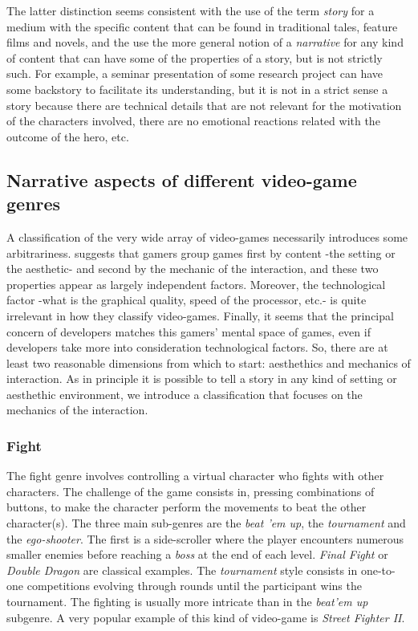 \documentclass[
		twoside,openright,titlepage,numbers=noenddot,manychapters,
		headinclude,%
                footinclude=false,cleardoublepage=empty,
                BCOR=5mm,
		fontsize=11pt, %
                 enabledeprecatedfontcommands]{scrreprt}
\begin{document}
The latter distinction seems consistent with the use of the term \emph{story} for a medium with the specific content that can be found in traditional tales, feature films and novels, and the use the more general notion of a \emph{narrative} for any kind of content that can have some of the properties of a story, but is not strictly such. For example, a seminar presentation of some research project can have some backstory to facilitate its understanding, but it is not in a strict sense a story because there are technical details that are not relevant for the motivation of the characters involved,  there are no emotional reactions related with the outcome of the hero, etc. 

\subsection{Narrative aspects of different video-game genres}

A classification of the very wide array of video-games necessarily introduces some arbitrariness. \cite{lewis2007mapping} suggests that gamers group games first by content -the setting or the aesthetic- and second by the mechanic of the interaction, and these two properties appear as largely independent factors. Moreover, the technological factor -what is the graphical quality, speed of the processor, etc.- is quite irrelevant in how they classify video-games.  Finally, it seems that the principal concern of developers matches this gamers' mental space of games, even if developers take more into consideration technological factors. So, there are at least two reasonable dimensions from which to start: aesthethics and mechanics of interaction. As in principle it is possible to tell a story in any kind of setting or aesthethic environment, we introduce a classification that focuses on the mechanics of the interaction. 


\subsubsection{Fight}

The fight genre involves controlling a virtual character who fights with other characters. 
 The challenge of the game consists in, pressing combinations of buttons,  to make the character perform the movements to beat the other character(s).  The three main sub-genres are the  \emph{beat 'em up}, the \emph{tournament} and the \emph{ego-shooter}. The first is a side-scroller where the player encounters numerous smaller enemies before reaching a \emph{boss} at the end of each level. \emph{Final Fight} or \emph{Double Dragon} are classical examples. The \emph{tournament} style consists in one-to-one competitions evolving through rounds until the participant wins the tournament. The fighting is usually more intricate than in the \emph{beat'em up} subgenre. A very popular example of this kind of video-game is \emph{Street Fighter II}. 
\end{document}
